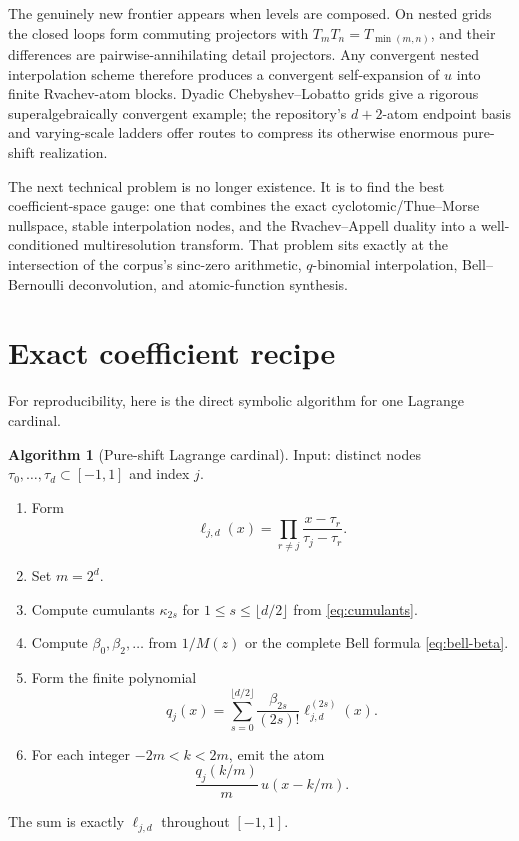 \documentclass[11pt,oneside]{article}
\numberwithin{equation}{section}
\theoremstyle{definition}
\newtheorem{algorithm}[theorem]{Algorithm}
\theoremstyle{remark}
\begin{document}
The genuinely new frontier appears when levels are composed.  On nested grids the
closed loops form commuting projectors with
\(T_mT_n=T_{\min(m,n)}\), and their differences are pairwise-annihilating detail
projectors.  Any convergent nested interpolation scheme therefore produces a
convergent self-expansion of \(u\) into finite Rvachev-atom blocks.  Dyadic
Chebyshev--Lobatto grids give a rigorous superalgebraically convergent example; the
repository's \(d+2\)-atom endpoint basis and varying-scale ladders offer routes to
compress its otherwise enormous pure-shift realization.

The next technical problem is no longer existence.  It is to find the best
coefficient-space gauge: one that combines the exact cyclotomic/Thue--Morse
nullspace, stable interpolation nodes, and the Rvachev--Appell duality into a
well-conditioned multiresolution transform.  That problem sits exactly at the
intersection of the corpus's sinc-zero arithmetic, \(q\)-binomial interpolation,
Bell--Bernoulli deconvolution, and atomic-function synthesis.

\appendix
\section{Exact coefficient recipe}
\label{app:recipe}
For reproducibility, here is the direct symbolic algorithm for one Lagrange
cardinal.

\begin{algorithm}[Pure-shift Lagrange cardinal]
Input: distinct nodes \(\tau_0,\ldots,\tau_d\subset[-1,1]\) and index \(j\).
\begin{enumerate}
\item Form
\[
 \ell_{j,d}(x)=\prod_{r\ne j}\frac{x-\tau_r}{\tau_j-\tau_r}.
\]
\item Set \(m=2^d\).
\item Compute cumulants \(\kappa_{2s}\) for
      \(1\le s\le\lfloor d/2\rfloor\) from \eqref{eq:cumulants}.
\item Compute \(\beta_0,\beta_2,\ldots\) from
      \(1/M(z)\) or the complete Bell formula \eqref{eq:bell-beta}.
\item Form the finite polynomial
\[
 q_j(x)=\sum_{s=0}^{\lfloor d/2\rfloor}
 \frac{\beta_{2s}}{(2s)!}\ell_{j,d}^{(2s)}(x).
\]
\item For each integer \(-2m<k<2m\), emit the atom
\[
 \frac{q_j(k/m)}{m}\,u(x-k/m).
\]
\end{enumerate}
The sum is exactly \(\ell_{j,d}\) throughout \([-1,1]\).
\end{algorithm}
\end{document}
